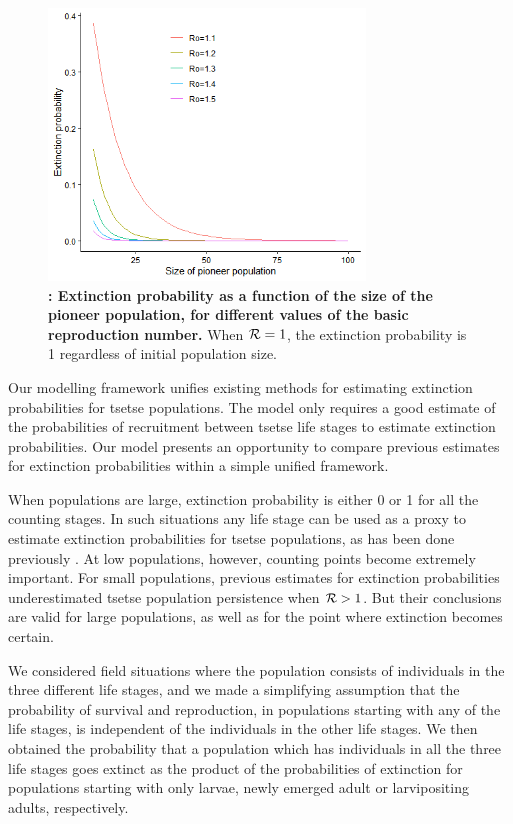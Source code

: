 \documentclass[smallextended]{svjour3}
\begin{document}
	\begin{figure}[h]
		\includegraphics[width=0.75\textwidth]{ExtinctionRepNumberPoineerPop.png}
		\caption{{\bf: Extinction probability as a function of the size of the pioneer population, for different values of the basic reproduction number.} When ${\cal R}=1$, the extinction probability is 1 regardless of initial population size.}
		\label{ExtPoineerSize}
	\end{figure}
	
	\newpage
	Our modelling framework unifies existing methods for estimating extinction probabilities for tsetse populations. The model only requires a good estimate of the probabilities of recruitment between tsetse life stages to estimate extinction probabilities. Our model presents an opportunity to compare previous estimates for extinction probabilities within a simple unified framework.
	
	When populations are large, extinction probability is either 0 or 1 for all the counting stages. In such situations any life stage can be used as a proxy to estimate extinction probabilities for tsetse populations, as has been done previously \cite{Hargrove2005a,Kajunguri2019}. At low populations, however, counting points become extremely important. For small populations, previous estimates for extinction probabilities underestimated tsetse population persistence when ${\cal R} > 1$. But their conclusions are valid for large populations, as well as for the point where extinction becomes certain.
	
	We considered field situations where the population consists of individuals in the three different life stages, and we made a simplifying assumption that the probability of survival and reproduction, in populations starting with any of the life stages, is independent of the individuals in the other life stages. We then obtained the probability that a population which has individuals in all the three life stages goes extinct as the product of the probabilities of extinction for populations starting with only larvae, newly emerged adult or larvipositing adults, respectively. 
	
\end{document}
